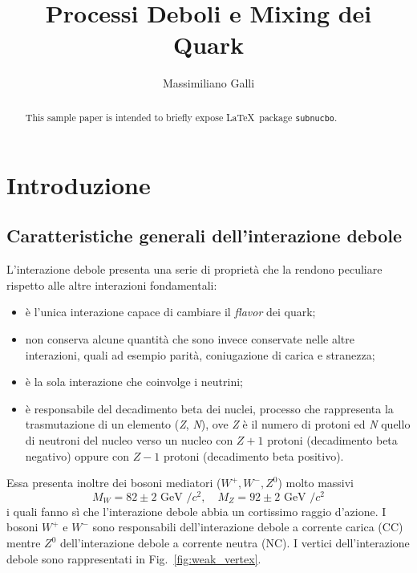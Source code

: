 \documentclass{subnucbo}
\title{Processi Deboli e Mixing dei Quark}
\author{Massimiliano Galli}
\begin{document}
\maketitle

\begin{abstract}
        This sample paper is intended to briefly expose \LaTeX\ package \texttt{subnucbo}.
\end{abstract}

\section{Introduzione}
\subsection{Caratteristiche generali dell'interazione debole}
L'interazione debole presenta una serie di proprietà che la rendono peculiare rispetto alle altre interazioni fondamentali:
\begin{itemize}
        \item è l'unica interazione capace di cambiare il \textit{flavor} dei quark;
        \item non conserva alcune quantità che sono invece conservate nelle altre interazioni, quali ad esempio parità, coniugazione di carica e stranezza;
        \item è la sola interazione che coinvolge i neutrini;
        \item è responsabile del decadimento beta dei nuclei, processo che rappresenta la trasmutazione di un elemento (\textit{Z}, \textit{N}), ove \textit{Z} è il numero di protoni ed \textit{N} quello di neutroni del nucleo verso un nucleo con $\textit{Z} + 1$ protoni (decadimento beta negativo) oppure con $\textit{Z} - 1$ protoni (decadimento beta positivo).
\end{itemize}
Essa presenta inoltre dei bosoni mediatori ($W^{+}, W^{-}, Z^{0}$) molto massivi
\begin{equation}
        M _ { W } = 82 \pm 2 \text { GeV } / c ^ { 2 } , \quad M _ { Z } = 92 \pm 2 \text { GeV } / c ^ { 2 }
        \label{eq:bosons_masses}
\end{equation}
i quali fanno sì che l'interazione debole abbia un cortissimo raggio d'azione. I bosoni $W^{+}$ e $W^{-}$ sono responsabili dell'interazione debole a corrente carica (CC) mentre $Z^{0}$ dell'interazione debole a corrente neutra (NC). I vertici dell'interazione debole sono rappresentati in Fig.~\ref{fig:weak_vertex}.
\end{document}
